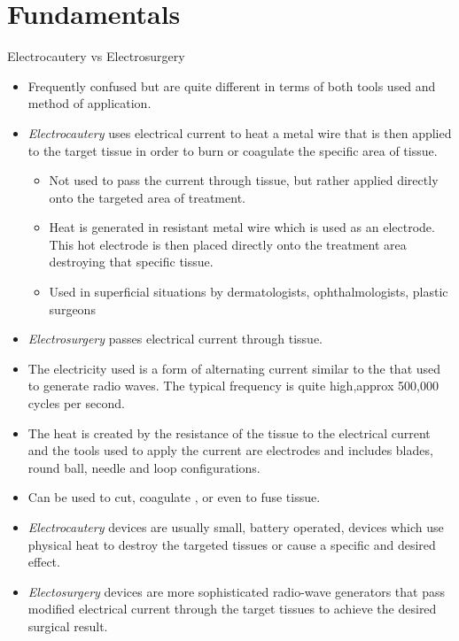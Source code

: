 \documentclass[]{beamer}
\begin{document}
\section{Fundamentals}
\begin{frame}{Electrocautery vs Electrosurgery}

\begin{itemize}
	\item Frequently confused but are quite different in terms of both tools used and method of application.
	\item \textit{Electrocautery} uses electrical current to heat a metal wire that is then applied to the target tissue in order to burn or coagulate the specific area of tissue.
	\begin{itemize}
		\item Not used to pass the current through tissue, but rather applied directly onto the targeted area of treatment. 
		\item Heat is generated in resistant metal wire which is used as an electrode. This hot electrode is then placed directly onto the treatment area destroying that specific tissue. 
		\item Used in superficial situations by dermatologists, ophthalmologists, plastic surgeons
	\end{itemize} 
\end{itemize}
\end{frame}


\begin{frame}
\begin{itemize}
	\item \textit{Electrosurgery} passes electrical current through tissue. 
	\item The electricity used is a form of alternating current similar to the that used to generate radio waves. The typical frequency is quite high,approx 500,000 cycles per second.
	\item The heat is created by the resistance of the tissue to the electrical current and the tools used to apply the current are electrodes and includes  blades, round ball, needle and loop configurations.
	\item Can be used to cut, coagulate , or even to fuse tissue.
		
	
	\end{itemize}
	
 \end{frame}

\begin{frame}
\begin{itemize}
	\item \textit{Electrocautery} devices are usually small, battery operated,   devices which use physical heat to destroy the targeted tissues or cause a specific and desired effect. 
	\item \textit{Electosurgery} devices are more sophisticated radio-wave generators that pass modified electrical current through the target tissues to achieve the desired surgical result.
	
\end{itemize}
\end{frame}
	
	
	
	
\end{document}
